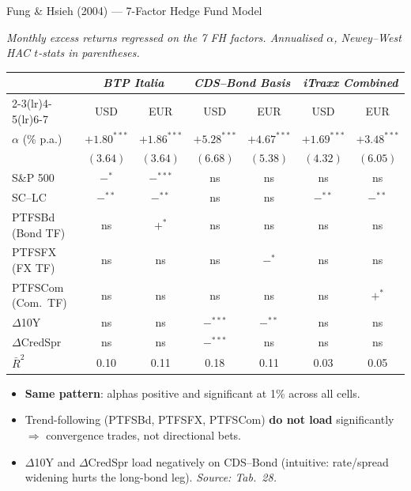 \documentclass[aspectratio=169,11pt]{beamer}
\newcommand{\hlt}[1]{\textcolor{edhecred}{\textbf{#1}}}     %
\newcommand{\hltb}[1]{\textcolor{accentblue}{\textbf{#1}}}  %
\begin{document}
\begin{frame}[t]{Fung \& Hsieh (2004) --- 7-Factor Hedge Fund Model}
\centering
\scriptsize
\vspace{0.05cm}

\textit{Monthly excess returns regressed on the 7 FH factors.
Annualised $\alpha$, Newey--West HAC $t$-stats in parentheses.}

\vspace{0.20cm}
\renewcommand{\arraystretch}{0.95}
\setlength{\tabcolsep}{4pt}

\begin{tabular}{lcccccc}
\toprule
 & \multicolumn{2}{c}{\textit{BTP Italia}}
 & \multicolumn{2}{c}{\textit{CDS--Bond Basis}}
 & \multicolumn{2}{c}{\textit{iTraxx Combined}} \\
\cmidrule(lr){2-3}\cmidrule(lr){4-5}\cmidrule(lr){6-7}
 & USD & EUR & USD & EUR & USD & EUR \\
\midrule
$\alpha$ (\% p.a.)  & \hlt{$+1.80^{***}$} & \hlt{$+1.86^{***}$}
                    & \hlt{$+5.28^{***}$} & \hlt{$+4.67^{***}$}
                    & \hlt{$+1.69^{***}$} & \hlt{$+3.48^{***}$} \\
                    & $(3.64)$ & $(3.64)$ & $(6.68)$ & $(5.38)$ & $(4.32)$ & $(6.05)$ \\
\addlinespace
S\&P 500            & $-^{*}$ & $-^{***}$ & ns & ns & ns & ns \\
SC--LC              & $-^{**}$ & $-^{**}$ & ns & ns & $-^{**}$ & $-^{**}$ \\
PTFSBd (Bond TF)    & ns & $+^{*}$ & ns & ns & ns & ns \\
PTFSFX (FX TF)      & ns & ns      & ns & $-^{*}$ & ns & ns \\
PTFSCom (Com.\ TF)  & ns & ns      & ns & ns & ns & $+^{*}$ \\
$\Delta$10Y         & ns & ns      & $-^{***}$ & $-^{**}$ & ns & ns \\
$\Delta$CredSpr     & ns & ns      & $-^{***}$ & ns & ns & ns \\
\addlinespace
$\bar R^2$ & 0.10 & 0.11 & 0.18 & 0.11 & 0.03 & 0.05 \\
\bottomrule
\end{tabular}

\vspace{0.30cm}

\begin{itemize}\itemsep=0.06cm\footnotesize
  \item \hlt{Same pattern}: alphas positive and significant at 1\% across all cells.
  \item Trend-following (PTFSBd, PTFSFX, PTFSCom) \hltb{do not load} significantly
        $\Rightarrow$ convergence trades, not directional bets.
  \item $\Delta$10Y and $\Delta$CredSpr load negatively on CDS--Bond (intuitive: rate/spread widening hurts the long-bond leg). \emph{Source: Tab.\ 28.}
\end{itemize}

\end{frame}
\end{document}
